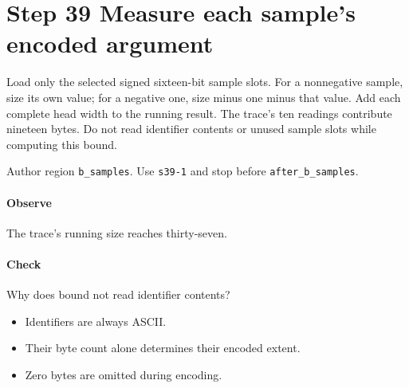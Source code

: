 \section{Step 39 Measure each sample's encoded argument}\label{cbor-s39}
Load only the selected signed sixteen-bit sample slots. For a nonnegative sample, size its own value; for a negative one, size minus one minus that value. Add each complete head width to the running result. The trace's ten readings contribute nineteen bytes. Do not read identifier contents or unused sample slots while computing this bound.

Author region \texttt{b\_samples}. Use \texttt{s39-1} and stop before \texttt{after\_b\_samples}.

\paragraph{Observe} The trace's running size reaches thirty-seven.

\paragraph{Check} Why does bound not read identifier contents?
\begin{itemize}
  \item[A.] Identifiers are always ASCII.
  \item[B.] Their byte count alone determines their encoded extent.
  \item[C.] Zero bytes are omitted during encoding.
\end{itemize}
